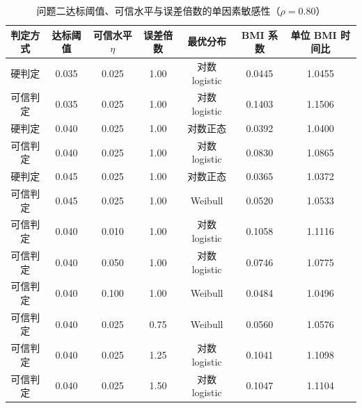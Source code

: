\begin{table}[!htbp]
  \centering
  \caption{问题二达标阈值、可信水平与误差倍数的单因素敏感性（$\rho=0.80$）}
  \label{tab:a3}
  \small
  \begin{tabular}{@{}ccccccc@{}}
    \toprule
    判定方式 & 达标阈值 & 可信水平 $\eta$ & 误差倍数 & 最优分布 & BMI 系数 & 单位 BMI 时间比 \\
    \midrule
    硬判定 & 0.035 & 0.025 & 1.00 & 对数 logistic & 0.0445 & 1.0455 \\
    可信判定 & 0.035 & 0.025 & 1.00 & 对数 logistic & 0.1403 & 1.1506 \\
    硬判定 & 0.040 & 0.025 & 1.00 & 对数正态 & 0.0392 & 1.0400 \\
    可信判定 & 0.040 & 0.025 & 1.00 & 对数 logistic & 0.0830 & 1.0865 \\
    硬判定 & 0.045 & 0.025 & 1.00 & 对数正态 & 0.0365 & 1.0372 \\
    可信判定 & 0.045 & 0.025 & 1.00 & Weibull & 0.0520 & 1.0533 \\
    可信判定 & 0.040 & 0.010 & 1.00 & 对数 logistic & 0.1058 & 1.1116 \\
    可信判定 & 0.040 & 0.050 & 1.00 & 对数 logistic & 0.0746 & 1.0775 \\
    可信判定 & 0.040 & 0.100 & 1.00 & Weibull & 0.0484 & 1.0496 \\
    可信判定 & 0.040 & 0.025 & 0.75 & Weibull & 0.0560 & 1.0576 \\
    可信判定 & 0.040 & 0.025 & 1.25 & 对数 logistic & 0.1041 & 1.1098 \\
    可信判定 & 0.040 & 0.025 & 1.50 & 对数 logistic & 0.1047 & 1.1104 \\
    \bottomrule
  \end{tabular}
\end{table}
